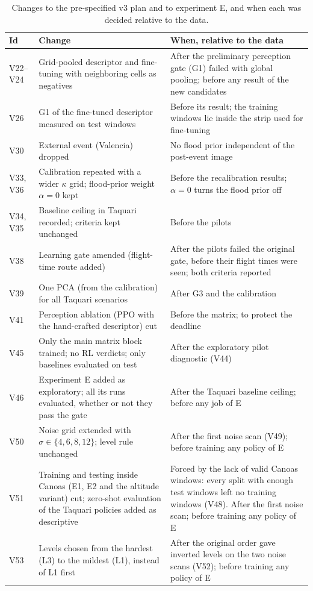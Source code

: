 \begin{table}[h]
\centering
\caption{Changes to the pre-specified v3 plan and to experiment E, and when each was decided relative to the data.}
\label{tab:changes}
\scriptsize
\setlength{\tabcolsep}{3pt}
\begin{tabular}{@{}lp{}p{}@{}}
\toprule
Id & Change & When, relative to the data \\
\midrule
V22--V24 & Grid-pooled descriptor and fine-tuning with neighboring cells as negatives & After the preliminary perception gate (G1) failed with global pooling; before any result of the new candidates \\
V26 & G1 of the fine-tuned descriptor measured on test windows & Before its result; the training windows lie inside the strip used for fine-tuning \\
V30 & External event (Valencia) dropped & No flood prior independent of the post-event image \\
V33, V36 & Calibration repeated with a wider $\kappa$ grid; flood-prior weight $\alpha = 0$ kept & Before the recalibration results; $\alpha = 0$ turns the flood prior off \\
V34, V35 & Baseline ceiling in Taquari recorded; criteria kept unchanged & Before the pilots \\
V38 & Learning gate amended (flight-time route added) & After the pilots failed the original gate, before their flight times were seen; both criteria reported \\
V39 & One PCA (from the calibration) for all Taquari scenarios & After G3 and the calibration \\
V41 & Perception ablation (PPO with the hand-crafted descriptor) cut & Before the matrix; to protect the deadline \\
V45 & Only the main matrix block trained; no RL verdicts; only baselines evaluated on test & After the exploratory pilot diagnostic (V44) \\
V46 & Experiment E added as exploratory; all its runs evaluated, whether or not they pass the gate & After the Taquari baseline ceiling; before any job of E \\
V50 & Noise grid extended with $\sigma \in \{4, 6, 8, 12\}$; level rule unchanged & After the first noise scan (V49); before training any policy of E \\
V51 & Training and testing inside Canoas (E1, E2 and the altitude variant) cut; zero-shot evaluation of the Taquari policies added as descriptive & Forced by the lack of valid Canoas windows: every split with enough test windows left no training windows (V48). After the first noise scan; before training any policy of E \\
V53 & Levels chosen from the hardest (L3) to the mildest (L1), instead of L1 first & After the original order gave inverted levels on the two noise scans (V52); before training any policy of E \\
\bottomrule
\end{tabular}
\end{table}

